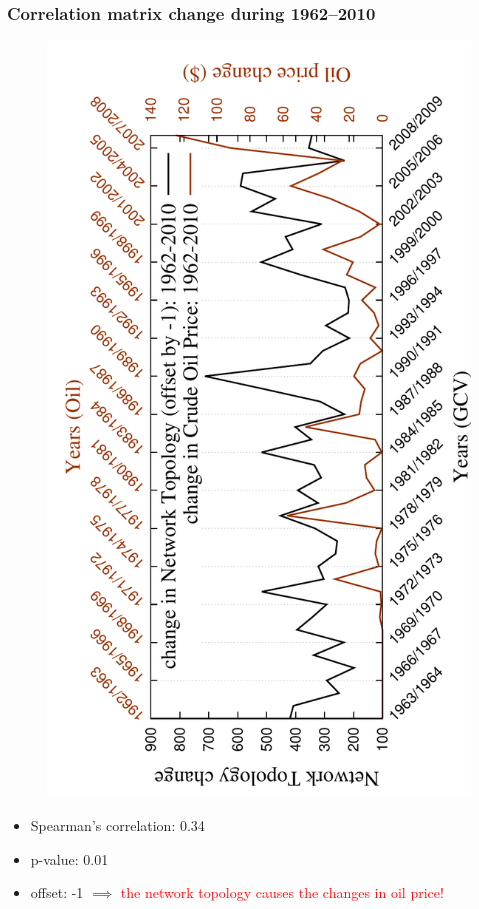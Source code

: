 \documentclass[11pt,xcolor=table]{beamer}
\begin{document}
\begin{frame}
  \frametitle{Correlation matrix change during 1962--2010}
  
  \begin{figure}
   \vspace{-0.25in}
   \includegraphics[angle=-90,scale=0.45]{../code/final_results_norm1/all_trade_thresh/change_over_time2}
  \end{figure}

  \begin{itemize}
   \item Spearman's correlation: 0.34
   \item p-value: 0.01
   \item offset: -1 $\implies$ \textcolor{red}{the network topology causes the changes in oil price!}
  \end{itemize}

  
\end{frame}
\end{document}
